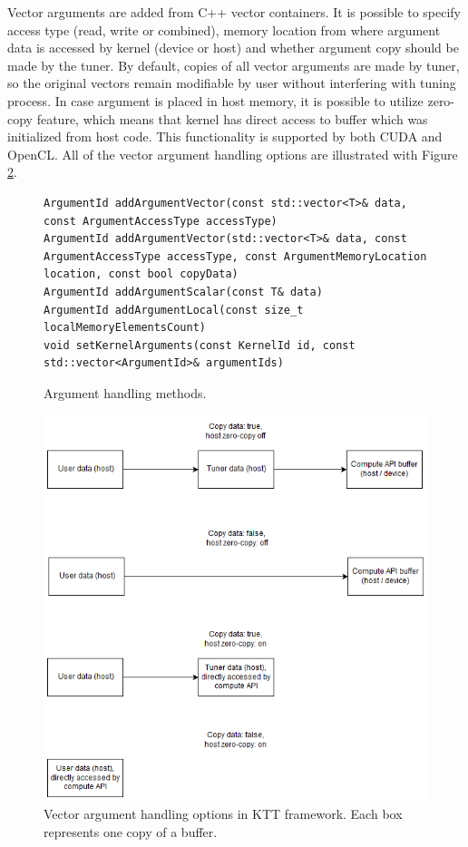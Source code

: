 \documentclass
[
    digital, %
    oneside, %
    table, %
    nolof, %
    nolot, %
    nocover %
]{fithesis3}
\begin{document}
Vector arguments are added from C++ vector containers. It is possible to specify access type (read, write or combined), memory location from where
argument data is accessed by kernel (device or host) and whether argument copy should be made by the tuner. By default, copies of all vector arguments
are made by tuner, so the original vectors remain modifiable by user without interfering with tuning process. In case argument is placed in host
memory, it is possible to utilize zero-copy feature, which means that kernel has direct access to buffer which was initialized from host code. This
functionality is supported by both CUDA and OpenCL. All of the vector argument handling options are illustrated with Figure \ref{ktt-buffer-diagram}.

\begin{figure}
\begin{adjustwidth}{-1cm}{-1cm}
\begin{lstlisting}
ArgumentId addArgumentVector(const std::vector<T>& data, const ArgumentAccessType accessType)
ArgumentId addArgumentVector(std::vector<T>& data, const ArgumentAccessType accessType, const ArgumentMemoryLocation location, const bool copyData)
ArgumentId addArgumentScalar(const T& data)
ArgumentId addArgumentLocal(const size_t localMemoryElementsCount)
void setKernelArguments(const KernelId id, const std::vector<ArgumentId>& argumentIds)
\end{lstlisting}
\caption{Argument handling methods.}
\label{ktt-argument-methods}
\end{adjustwidth}
\end{figure}

\begin{figure}
\begin{center}
\includegraphics[width=125mm]{resources/ktt_buffer_diagram.png}
\end{center}
\caption{Vector argument handling options in KTT framework. Each box represents one copy of a buffer.}
\label{ktt-buffer-diagram}
\end{figure}
\end{document}
